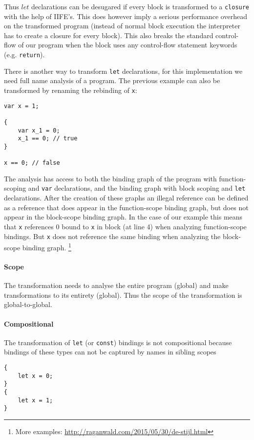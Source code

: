Thus $let$ declarations can be desugared if every block is transformed to a \lstinline$closure$ with the help of IIFE's. This does however imply a serious performance overhead on the transformed program (instead of normal block execution the interpreter has to create a closure for every block). This also breaks the standard control-flow of our program when the block uses any control-flow statement keywords (e.g. \lstinline$return$). 

There is another way to transform \lstinline$let$ declarations, for this implementation we need full name analysis of a program. The previous example can also be transformed by renaming the rebinding of \lstinline$x$:

\begin{lstlisting}
var x = 1;

{
	var x_1 = 0;
	x_1 == 0; // true
}

x == 0; // false
\end{lstlisting}

The analysis has access to both the binding graph of the program with function-scoping and \lstinline$var$ declarations, and the binding graph with block scoping and \lstinline$let$ declarations. After the creation of these graphs an illegal reference can be defined as a reference that does appear in the function-scope binding graph, but does not appear in the block-scope binding graph. In the case of our example this means that \lstinline$x$ references 0 bound to \lstinline$x$ in block (at line 4) when analyzing function-scope bindings. But \lstinline$x$ does not reference the same binding when analyzing the block-scope binding graph. \footnote{More examples: \url{http://raganwald.com/2015/05/30/de-stijl.html}}

\paragraph{Scope}
The transformation needs to analyse the entire program (global) and make transformations to its entirety (global). Thus the scope of the transformation is global-to-global.

\paragraph{Compositional}
The transformation of \lstinline$let$ (or \lstinline$const$) bindings is not compositional because bindings of these types can not be captured by names in sibling scopes

\begin{lstlisting}
{
	let x = 0;
}
{
	let x = 1;
}
\end{lstlisting} 

